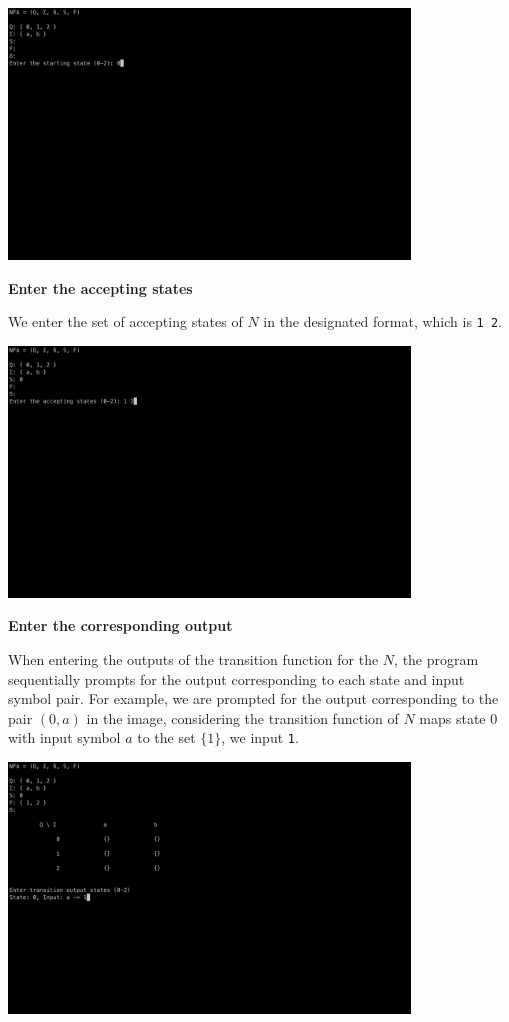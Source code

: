 \documentclass{article}
\begin{document}
\begin{center}
  \includegraphics[width=0.8\textwidth]{start}
\end{center}

\newpage

\textbf{\large Enter the accepting states}

We enter the set of accepting states of $N$ in the designated format, which is \verb|1 2|.

\begin{center}
  \includegraphics[width=0.8\textwidth]{accept}
\end{center}

\textbf{\large Enter the corresponding output}

When entering the outputs of the transition function for the $N$, the program sequentially prompts
for the output corresponding to each state and input symbol pair. For example, we are prompted for
the output corresponding to the pair $(0, a)$ in the image, considering the transition function of
$N$ maps state 0 with input symbol $a$ to the set $\{1\}$, we input \verb|1|.

\begin{center}
  \includegraphics[width=0.8\textwidth]{trans}
\end{center}
\end{document}
